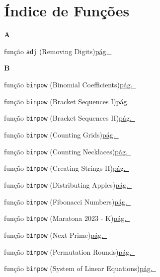 \documentclass[10pt, a4paper, twocolumn, landscape]{article}
\begin{document}
\section{Índice de Funções}
{\small
\par\medskip\textbf{\large A}\par
\noindent função \texttt{adj} {\scriptsize\color{codegray}(Removing Digits)}\dotfill\hyperref[fn13]{pág.~\pageref*{fn13}}\par
\par\medskip\textbf{\large B}\par
\noindent função \texttt{binpow} {\scriptsize\color{codegray}(Binomial Coefficients)}\dotfill\hyperref[fn1]{pág.~\pageref*{fn1}}\par
\noindent função \texttt{binpow} {\scriptsize\color{codegray}(Bracket Sequences I)}\dotfill\hyperref[fn42]{pág.~\pageref*{fn42}}\par
\noindent função \texttt{binpow} {\scriptsize\color{codegray}(Bracket Sequences II)}\dotfill\hyperref[fn47]{pág.~\pageref*{fn47}}\par
\noindent função \texttt{binpow} {\scriptsize\color{codegray}(Counting Grids)}\dotfill\hyperref[fn51]{pág.~\pageref*{fn51}}\par
\noindent função \texttt{binpow} {\scriptsize\color{codegray}(Counting Necklaces)}\dotfill\hyperref[fn50]{pág.~\pageref*{fn50}}\par
\noindent função \texttt{binpow} {\scriptsize\color{codegray}(Creating Strings II)}\dotfill\hyperref[fn19]{pág.~\pageref*{fn19}}\par
\noindent função \texttt{binpow} {\scriptsize\color{codegray}(Distributing Apples)}\dotfill\hyperref[fn20]{pág.~\pageref*{fn20}}\par
\noindent função \texttt{binpow} {\scriptsize\color{codegray}(Fibonacci Numbers)}\dotfill\hyperref[fn25]{pág.~\pageref*{fn25}}\par
\noindent função \texttt{binpow} {\scriptsize\color{codegray}(Maratona 2023 - K)}\dotfill\hyperref[fn38]{pág.~\pageref*{fn38}}\par
\noindent função \texttt{binpow} {\scriptsize\color{codegray}(Next Prime)}\dotfill\hyperref[fn73]{pág.~\pageref*{fn73}}\par
\noindent função \texttt{binpow} {\scriptsize\color{codegray}(Permutation Rounds)}\dotfill\hyperref[fn77]{pág.~\pageref*{fn77}}\par
\noindent função \texttt{binpow} {\scriptsize\color{codegray}(System of Linear Equations)}\dotfill\hyperref[fn66]{pág.~\pageref*{fn66}}\par
}
\end{document}
